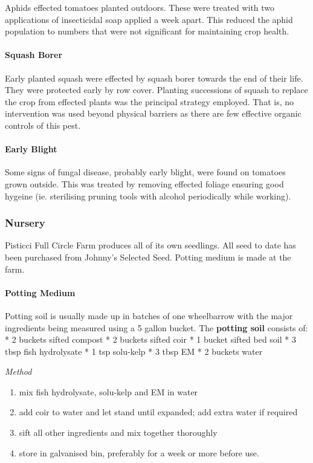 Aphids effected tomatoes planted outdoors. These were treated with two
applications of insecticidal soap applied a week apart. This reduced the
aphid population to numbers that were not significant for maintaining
crop health.

\paragraph{Squash Borer}\label{squash-borer}

Early planted squash were effected by squash borer towards the end of
their life. They were protected early by row cover. Planting successions
of squash to replace the crop from effected plants was the principal
strategy employed. That is, no intervention was used beyond physical
barriers as there are few effective organic controls of this pest.

\paragraph{Early Blight}\label{early-blight}

Some signs of fungal disease, probably early blight, were found on
tomatoes grown outside. This was treated by removing effected foliage
ensuring good hygeine (ie. sterilising pruning tools with alcohol
periodically while working).

\subsubsection{Nursery}\label{nursery}

Pisticci Full Circle Farm produces all of its own seedlings. All seed to
date has been purchased from Johnny's Selected Seed. Potting medium is
made at the farm.

\paragraph{Potting Medium}\label{potting-medium}

Potting soil is usually made up in batches of one wheelbarrow with the
major ingredients being measured using a 5 gallon bucket. The
\textbf{potting soil} consists of: * 2 buckets sifted compost * 2
buckets sifted coir * 1 bucket sifted bed soil * 3 tbsp fish hydrolysate
* 1 tsp solu-kelp * 3 tbsp EM * 2 buckets water

\emph{Method}

\begin{enumerate}
\def\labelenumi{\arabic{enumi}.}
\itemsep1pt\parskip0pt
\item
  mix fish hydrolysate, solu-kelp and EM in water
\item
  add coir to water and let stand until expanded; add extra water if
  required
\item
  sift all other ingredients and mix together thoroughly
\item
  store in galvanised bin, preferably for a week or more before use.
\end{enumerate}

